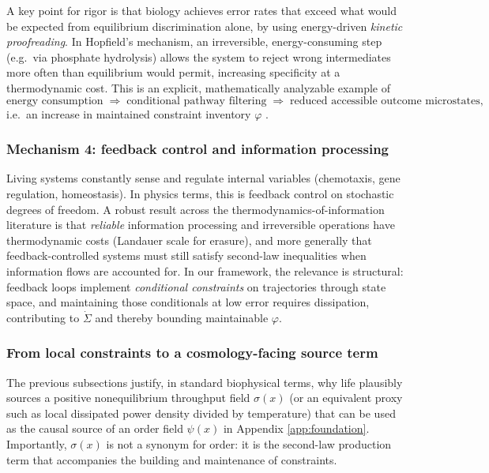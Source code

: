 \documentclass[10pt]{article}
\begin{document}
A key point for rigor is that biology achieves error rates that exceed what would be expected from
equilibrium discrimination alone, by using energy-driven \emph{kinetic proofreading}. In Hopfield’s
mechanism, an irreversible, energy-consuming step (e.g.\ via phosphate hydrolysis) allows the system
to reject wrong intermediates more often than equilibrium would permit, increasing specificity at a
thermodynamic cost. This is an explicit, mathematically analyzable example of
\[
\text{energy consumption} \;\Rightarrow\; \text{conditional pathway filtering} \;\Rightarrow\;
\text{reduced accessible outcome microstates},
\]
i.e.\ an increase in maintained constraint inventory \(\varphi\) \cite{Hopfield1974Proofreading,Ninio1975Proofreading}.

\subsubsection{Mechanism 4: feedback control and information processing}
Living systems constantly sense and regulate internal variables (chemotaxis, gene regulation,
homeostasis). In physics terms, this is feedback control on stochastic degrees of freedom. A robust
result across the thermodynamics-of-information literature is that \emph{reliable} information
processing and irreversible operations have thermodynamic costs (Landauer scale for erasure), and
more generally that feedback-controlled systems must still satisfy second-law inequalities when
information flows are accounted for. In our framework, the relevance is structural: feedback loops
implement \emph{conditional constraints} on trajectories through state space, and maintaining those
conditionals at low error requires dissipation, contributing to \(\dot\Sigma\) and thereby bounding
maintainable \(\varphi\). \cite{Parrondo2015ThermoInfo,Landauer1961,Bennett1982}

\subsubsection{From local constraints to a cosmology-facing source term}
The previous subsections justify, in standard biophysical terms, why life plausibly sources a
positive nonequilibrium throughput field \(\sigma(x)\) (or an equivalent proxy such as local
dissipated power density divided by temperature) that can be used as the causal source of an
order field \(\psi(x)\) in Appendix \ref{app:foundation}. Importantly, \(\sigma(x)\) is not a
synonym for order: it is the second-law production term that accompanies the building and
maintenance of constraints.
\end{document}
